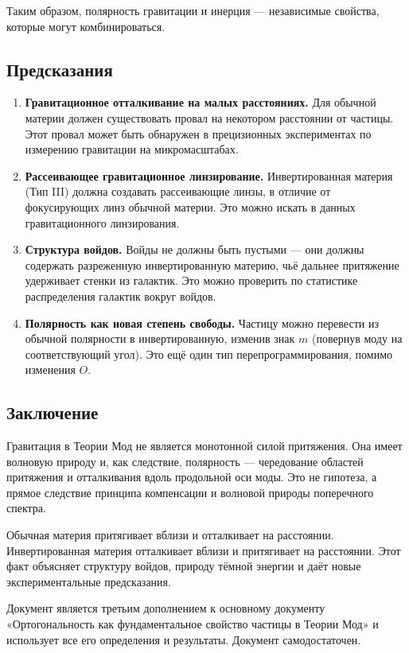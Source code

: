 \documentclass[12pt,a4paper]{article}
\begin{document}
Таким образом, полярность гравитации и инерция --- независимые свойства, которые могут комбинироваться.

\subsection{Предсказания}
\begin{enumerate}[label=\arabic*.]
    \item \textbf{Гравитационное отталкивание на малых расстояниях.} Для обычной материи должен существовать провал на некотором расстоянии от частицы. Этот провал может быть обнаружен в прецизионных экспериментах по измерению гравитации на микромасштабах.
    \item \textbf{Рассеивающее гравитационное линзирование.} Инвертированная материя (Тип III) должна создавать рассеивающие линзы, в отличие от фокусирующих линз обычной материи. Это можно искать в данных гравитационного линзирования.
    \item \textbf{Структура войдов.} Войды не должны быть пустыми --- они должны содержать разреженную инвертированную материю, чьё дальнее притяжение удерживает стенки из галактик. Это можно проверить по статистике распределения галактик вокруг войдов.
    \item \textbf{Полярность как новая степень свободы.} Частицу можно перевести из обычной полярности в инвертированную, изменив знак $m$ (повернув моду на соответствующий угол). Это ещё один тип перепрограммирования, помимо изменения $O$.
\end{enumerate}

\subsection{Заключение}
Гравитация в Теории Мод не является монотонной силой притяжения. Она имеет волновую природу и, как следствие, полярность --- чередование областей притяжения и отталкивания вдоль продольной оси моды. Это не гипотеза, а прямое следствие принципа компенсации и волновой природы поперечного спектра.

Обычная материя притягивает вблизи и отталкивает на расстоянии. Инвертированная материя отталкивает вблизи и притягивает на расстоянии. Этот факт объясняет структуру войдов, природу тёмной энергии и даёт новые экспериментальные предсказания.

Документ является третьим дополнением к основному документу «Ортогональность как фундаментальное свойство частицы в Теории Мод» и использует все его определения и результаты. Документ самодостаточен.
\end{document}
